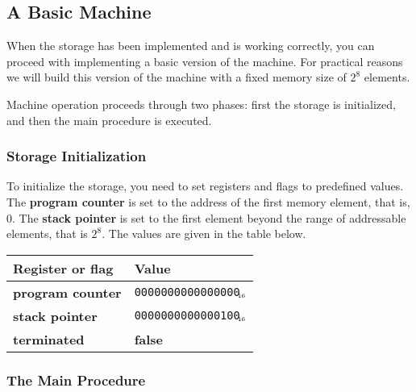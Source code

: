 \documentclass[a4paper,11pt]{article}
\newcommand{\PC}{\textbf{program counter}\xspace}
\newcommand{\SP}{\textbf{stack pointer}\xspace}
\newcommand{\TERM}{\textbf{terminated}\xspace}
\newcommand{\F}{\textbf{false}\xspace}
\newcommand{\num}[1]{\texttt{#1}\xspace}
\newcommand{\hex}[1]{\num{#1}$_{\textup{\tiny\hskip-1ex 16}}$\xspace}
\begin{document}
\subsection{A Basic Machine}

When the storage has been implemented and is working correctly, you can proceed with implementing a basic version of the machine.
For practical reasons we will build this version of the machine with a fixed memory size of $2^{8}$ elements.

Machine operation proceeds through two phases: first the storage is initialized, and then the main procedure is executed.

\subsubsection{Storage Initialization}

To initialize the storage, you need to set registers and flags to predefined values.
The \PC is set to the address of the first memory element, that is, $0$.
The \SP is set to the first element beyond the range of addressable elements, that is $2^{8}$.
The values are given in the table below.

\begin{center}
  \begin{tabular}{@{}ll@{}}
    \hline
    Register or flag & Value                   \\
    \hline
    \PC              & \hex{0000000000000000}  \\
    \SP              & \hex{0000000000000100}  \\
    \TERM            & \F                      \\
    \hline
  \end{tabular}
\end{center}

\subsubsection{The Main Procedure}
\end{document}
